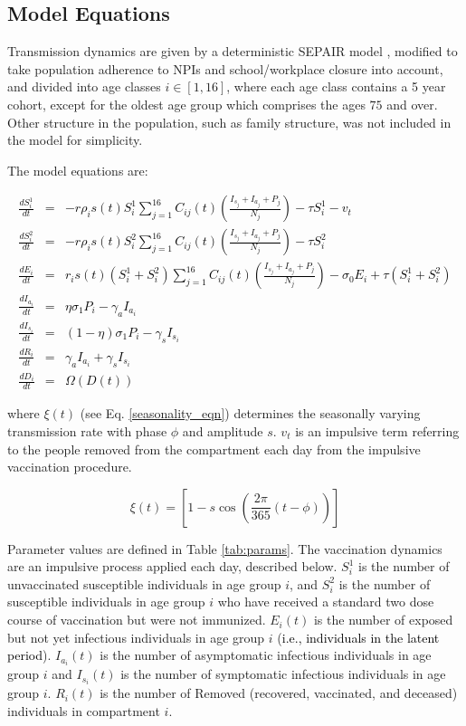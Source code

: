 \subsection{Model Equations}
 
Transmission dynamics are given by a deterministic SEPAIR model \cite{wu2006reducing}, modified to take population adherence to NPIs and school/workplace closure into account, and divided into age classes $i \in [1,16]$, where each age class contains a 5 year cohort, except for the oldest age group which comprises the ages $75$ and over. Other structure in the population, such as family structure, was not included in the model for simplicity. 

The model equations are:

\textcolor{black}{\begin{eqnarray}
  \frac{dS^1_i}{dt} &= & - r \rho_i s(t) S^1_i \sum_{j=1}^{16} C_{ij}(t) \left(\frac{I_{s_j} + I_{a_j} + P_j}{N_j}\right) - \tau S^1_i - v_t \label{S1eqn} \\
  \frac{dS^2_i}{dt} &= & - r \rho_i s(t) S^2_i \sum_{j=1}^{16} C_{ij}(t) \left(\frac{I_{s_j} + I_{a_j}+ P_j}{N_j}\right)  - \tau S^2_i \label{S2eqn} \\
  \frac{dE_i}{dt} &= &  r_i s(t) (S^1_i + S^2_i) \sum_{j=1}^{16} C_{ij}(t) \left(\frac{I_{s_j} + I_{a_j}+ P_j}{N_j}\right) - \sigma_0 E_i + \tau (S^1_i + S^2_i)\label{Eeqn} \\
  \frac{dI_{a_i}}{dt} &= & \eta \sigma_1 P_i - \gamma_a I_{a_i}\label{Iaeqn} \\
  \frac{dI_{s_i}}{dt} &= & (1 - \eta) \sigma_1 P_i - \gamma_s I_{s_i} \label{Iseqn} \\
\frac{dR_i}{dt} &= & \gamma_a I_{a_i} + \gamma_s I_{s_i}  \label{Reqn} \\
\frac{dD_i}{dt} &= & \Omega(D(t)) \label{Deqn}
\end{eqnarray}}

where $\xi(t)$ (see Eq. \ref{seasonality_eqn}) determines the seasonally varying transmission rate with phase $\phi$ and amplitude $s$. $v_t$ is an impulsive term referring to the people removed from the compartment each day from the impulsive vaccination procedure.

\begin{equation}
  \xi(t) = \left[1 - s \cos\left(\frac{2 \pi}{365} (t - \phi) \right)\right]
  \label{seasonality_eqn}
\end{equation}


\noindent Parameter values are defined in Table \ref{tab:params}. The vaccination dynamics are an impulsive process applied each day, described below. $S^{1}_i$ is the number of unvaccinated susceptible individuals in age group $i$, and $S^{2}_i$ is the number of susceptible individuals in age group $i$ who have received a standard two dose course of vaccination but were not immunized. $E_i(t)$ is the number of exposed but not yet infectious individuals in age group $i$ (\textcolor{black}{i.e., individuals in the latent period}). $I_{a_i}(t)$ is the number of asymptomatic infectious individuals in age group $i$ and $I_{s_i}(t)$ is the number of symptomatic infectious individuals in age group $i$. $R_i(t)$ is the number of Removed (recovered, vaccinated, and deceased) individuals in compartment $i$.

